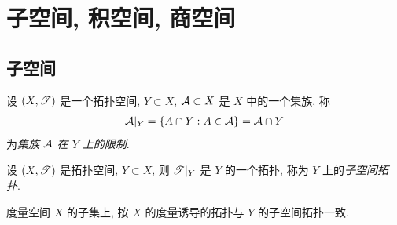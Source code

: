 \section{子空间, 积空间, 商空间}
\subsection{子空间}
    \begin{Definition}[集族在一个子集上的限制]
        设 $ (X, \mathscr{T}) $ 是一个拓扑空间, $ Y\subset X $, $ \mathcal{A}\subset X $ 是 $ X $ 中的一个集族, 称
        \begin{align*}
            \mathcal{A}|_{Y}=\left\{ A\cap Y:A\in\mathcal{A} \right\}=\mathcal{A}\cap Y
        \end{align*}
        为\emph{集族 $ \mathcal{A} $ 在 $ Y $ 上的限制}.
    \end{Definition}

    \begin{Definition}[子空间拓扑]
        设 $ (X, \mathscr{T}) $ 是拓扑空间, $ Y\subset X $, 则 $ \mathscr{T}|_{Y} $ 是 $ Y $ 的一个拓扑, 称为 $ Y $ 上的\emph{子空间拓扑}.
    \end{Definition}
    
    \begin{Remark}
        度量空间 $ X $ 的子集上, 按 $ X $ 的度量诱导的拓扑与 $ Y $ 的子空间拓扑一致.
    \end{Remark}

